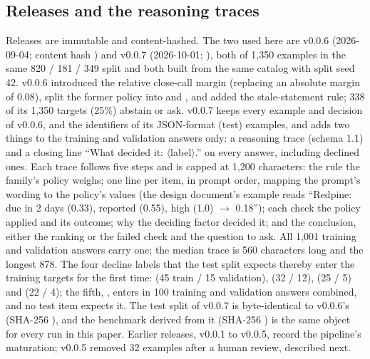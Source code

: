 \subsection{Releases and the reasoning traces}
Releases are immutable and content-hashed. The two used here are v0.0.6 (2026-09-04; content hash ) and v0.0.7 (2026-10-01; ), both of 1,350 examples in the same 820 / 181 / 349 split and both built from the same catalog with split seed 42. v0.0.6 introduced the relative close-call margin (replacing an absolute margin of 0.08), split the former  policy into  and , and added the stale-statement rule; 338 of its 1,350 targets (25\%) abstain or ask. v0.0.7 keeps every example and decision of v0.0.6, and the identifiers of its JSON-format (test) examples, and adds two things to the training and validation answers only: a reasoning trace (schema 1.1) and a closing line ``What decided it: $\langle$label$\rangle$.'' on every answer, including declined ones. Each trace follows five steps and is capped at 1,200 characters: the rule the family's policy weighs; one line per item, in prompt order, mapping the prompt's wording to the policy's values (the design document's example reads ``Redpine: due in 2 days (0.33), reported (0.55), high (1.0) $\rightarrow$ 0.18''); each check the policy applied and its outcome; why the deciding factor decided it; and the conclusion, either the ranking or the failed check and the question to ask. All 1,001 training and validation answers carry one; the median trace is 560 characters long and the longest 878. The four decline labels that the test split expects thereby enter the training targets for the first time:  (45 train / 15 validation),  (32 / 12),  (25 / 5) and  (22 / 4); the fifth, , enters in 100 training and validation answers combined, and no test item expects it. The test split of v0.0.7 is byte-identical to v0.0.6's (SHA-256 ), and the benchmark derived from it (SHA-256 ) is the same object for every run in this paper. Earlier releases, v0.0.1 to v0.0.5, record the pipeline's maturation; v0.0.5 removed 32 examples after a human review, described next.

